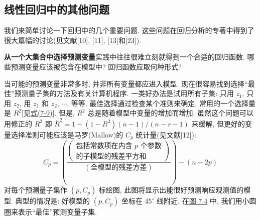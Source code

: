 
\subsection{线性回归中的其他问题}

我们来简单讨论一下回归中的几个重要问题. 这些问题在回归分析的专著中得到了很大篇幅的讨论(见文献[10], [11], [13]和[23]).

\noindent\textbf{从一个大集合中选择预测变量}\quad 实践中往往很难立刻就得到一个合适的回归函数. 哪些预测变量应该被包含在模型中? 回归函数应取何种形式?

当可能的预测变量非常多时, 并非所有变量都应进入模型. 现在很容易找到选择``最佳''预测量子集的方法及有关计算机程序. 一类好办法是试用所有子集: 只用 $z_1$, 只用 $z_2$, 用 $z_1$ 和 $z_2$, $\cdots$, 等等. 最佳选择通过检查某个准则来确定, 常用的一个选择量是 $R^2$[见\hyperref[eq:7-9]{式(7-9)}]. 但是, $R^2$ 总是随着模型中变量的增加而增加. 虽然这个问题可以用修正的 $R^2$ 即 $\bar{R}^2=1-(1-R^2)(n-1)/(n-r-1)$ 来缓解, 但更好的变量选择准则可能应该是马罗(Mallow)的 $C_p$ 统计量(见文献[12]):
\[
C_p=\left(\frac{\left(\begin{array}{c}\text{包括常数项在内含 }p\text{ 个参数}\\[-0.3ex]\text{的子模型的残差平方和}\end{array}\right)}{(\text{全模型的残差方差})}\right)-(n-2p)
\]
对每个预测量子集作 $(p,C_p)$ 标绘图, 此图将显示出能很好预测响应观测值的模型. 典型的情况是: 好模型的 $(p,C_p)$ 坐标在 $45^\circ$ 线附近. 在\hyperref[fig:7.4]{图 7.4} 中, 我们用小圆圈来表示``最佳''预测变量子集.

